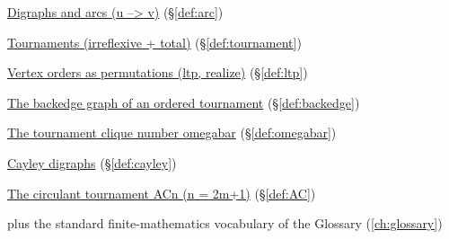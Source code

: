 \begin{closurepanel}
\item \hyperref[def:arc]{Digraphs and arcs (u --> v)} (\S\ref*{def:arc})
\item \hyperref[def:tournament]{Tournaments (irreflexive + total)} (\S\ref*{def:tournament})
\item \hyperref[def:ltp]{Vertex orders as permutations (ltp, realize)} (\S\ref*{def:ltp})
\item \hyperref[def:backedge]{The backedge graph of an ordered tournament} (\S\ref*{def:backedge})
\item \hyperref[def:omegabar]{The tournament clique number omegabar} (\S\ref*{def:omegabar})
\item \hyperref[def:cayley]{Cayley digraphs} (\S\ref*{def:cayley})
\item \hyperref[def:AC]{The circulant tournament ACn (n = 2m+1)} (\S\ref*{def:AC})
\item plus the standard finite-mathematics vocabulary of the Glossary (\cref{ch:glossary})
\end{closurepanel}
